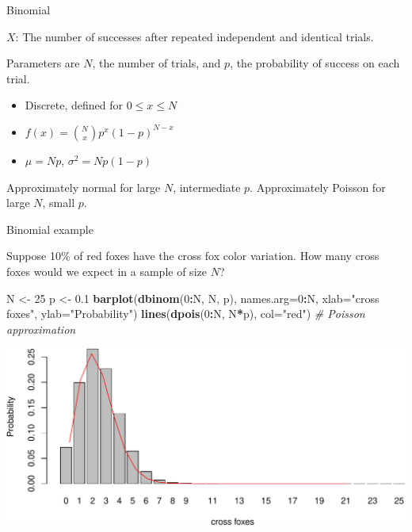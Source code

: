 \documentclass[
  ignorenonframetext,
]{beamer}
\newenvironment{Shaded}{\begin{snugshade}}{\end{snugshade}}
\newcommand{\CommentTok}[1]{\textcolor[rgb]{0.56,0.35,0.01}{\textit{#1}}}
\newcommand{\DataTypeTok}[1]{\textcolor[rgb]{0.13,0.29,0.53}{#1}}
\newcommand{\DecValTok}[1]{\textcolor[rgb]{0.00,0.00,0.81}{#1}}
\newcommand{\FloatTok}[1]{\textcolor[rgb]{0.00,0.00,0.81}{#1}}
\newcommand{\KeywordTok}[1]{\textcolor[rgb]{0.13,0.29,0.53}{\textbf{#1}}}
\newcommand{\NormalTok}[1]{#1}
\newcommand{\OperatorTok}[1]{\textcolor[rgb]{0.81,0.36,0.00}{\textbf{#1}}}
\newcommand{\StringTok}[1]{\textcolor[rgb]{0.31,0.60,0.02}{#1}}
\providecommand{\tightlist}{%
  \setlength{\itemsep}{0pt}\setlength{\parskip}{0pt}}
\begin{document}
\begin{frame}{Binomial}
\protect\hypertarget{binomial}{}

\(X\): The number of successes after repeated independent and identical
trials.

Parameters are \(N\), the number of trials, and \(p\), the probability
of success on each trial.

\begin{itemize}
\tightlist
\item
  Discrete, defined for \(0\leq x \leq N\)
\item
  \(f(x)={N\choose x}p^x(1-p)^{N-x}\)
\item
  \(\mu=Np\), \(\sigma^2=Np(1-p)\)
\end{itemize}

Approximately normal for large \(N\), intermediate \(p\). Approximately
Poisson for large \(N\), small \(p\).

\end{frame}

\begin{frame}[fragile]{Binomial example}
\protect\hypertarget{binomial-example}{}

Suppose 10\% of red foxes have the cross fox color variation. How many
cross foxes would we expect in a sample of size \(N\)?

\scriptsize

\begin{Shaded}
\begin{Highlighting}[]
\NormalTok{N <-}\StringTok{ }\DecValTok{25}
\NormalTok{p <-}\StringTok{ }\FloatTok{0.1}
\KeywordTok{barplot}\NormalTok{(}\KeywordTok{dbinom}\NormalTok{(}\DecValTok{0}\OperatorTok{:}\NormalTok{N, N, p), }
        \DataTypeTok{names.arg=}\DecValTok{0}\OperatorTok{:}\NormalTok{N, }\DataTypeTok{xlab=}\StringTok{"cross foxes"}\NormalTok{, }\DataTypeTok{ylab=}\StringTok{"Probability"}\NormalTok{)}
\KeywordTok{lines}\NormalTok{(}\KeywordTok{dpois}\NormalTok{(}\DecValTok{0}\OperatorTok{:}\NormalTok{N, N}\OperatorTok{*}\NormalTok{p), }\DataTypeTok{col=}\StringTok{"red"}\NormalTok{) }\CommentTok{# Poisson approximation}
\end{Highlighting}
\end{Shaded}

\includegraphics{noise_files/figure-beamer/unnamed-chunk-4-1.pdf}

\end{frame}
\end{document}
